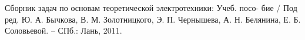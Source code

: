 
\begin{thebibliography}{9} 
    Сборник задач по основам теоретической электротехники: Учеб. посо-
    бие / Под ред. Ю. А. Бычкова, В. М. Золотницкого, Э. П. Чернышева,
    А. Н. Белянина, Е. Б. Соловьевой. – СПб.: Лань, 2011.
\end{thebibliography}